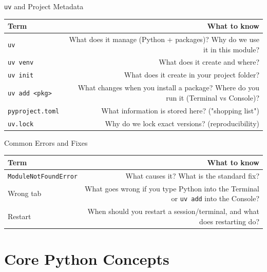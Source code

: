 \documentclass[9pt,aspectratio=169]{beamer}
\begin{document}
\begin{frame}{\texttt{uv} and Project Metadata}

\begin{tabular}{@{}lR@{}}
\toprule
\textbf{Term} & \textbf{What to know} \\
\midrule
\alert{\texttt{uv}} & What does it manage (Python + packages)? Why do we use it in this module? \\[0.8em]
\alert{\texttt{uv venv}} & What does it create and where? \\[0.8em]
\alert{\texttt{uv init}} & What does it create in your project folder? \\[0.8em]
\alert{\texttt{uv add <pkg>}} & What changes when you install a package? Where do you run it (Terminal vs Console)? \\[0.8em]
\alert{\texttt{pyproject.toml}} & What information is stored here? ("shopping list") \\[0.8em]
\alert{\texttt{uv.lock}} & Why do we lock exact versions? (reproducibility) \\
\bottomrule
\end{tabular}

\end{frame}


\begin{frame}{Common Errors and Fixes}

\begin{tabular}{@{}lR@{}}
\toprule
\textbf{Term} & \textbf{What to know} \\
\midrule
\alert{\texttt{ModuleNotFoundError}} & What causes it? What is the standard fix? \\[0.8em]
\alert{Wrong tab} & What goes wrong if you type Python into the Terminal or \texttt{uv add} into the Console? \\[0.8em]
\alert{Restart} & When should you restart a session/terminal, and what does restarting do? \\
\bottomrule
\end{tabular}

\end{frame}


\section{Core Python Concepts}
\end{document}
